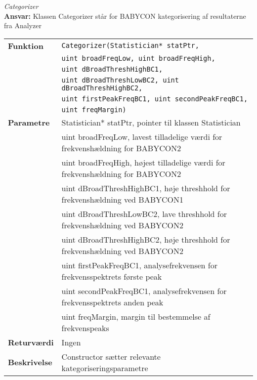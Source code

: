 \textit{Categorizer} \\
\textbf{Ansvar:} Klassen Categorizer står for BABYCON kategorisering af resultaterne fra Analyzer

\begin{center}
    \begin{tabular}{ | l | p{} |}
    \hline
    \textbf{Funktion}	& \verb+Categorizer(Statistician* statPtr,+ \\
    					& \verb+uint broadFreqLow, uint broadFreqHigh,+\\
    					& \verb+uint dBroadThreshHighBC1,+\\
    					& \verb+uint dBroadThreshLowBC2, uint dBroadThreshHighBC2,+ \\
    					& \verb+uint firstPeakFreqBC1, uint secondPeakFreqBC1,+ \\
    					& \verb+uint freqMargin) +						\\ \hline
    \textbf{Parametre} 	& Statistician* statPtr, pointer til klassen Statistician \\
    					& uint broadFreqLow, lavest tilladelige værdi for frekvenshældning for BABYCON2 \\
    					& uint broadFreqHigh, højest tilladelige værdi for frekvenshældning for BABYCON2 \\
    					& uint dBroadThreshHighBC1, høje threshhold for frekvenshældning ved BABYCON1 \\
    					& uint dBroadThreshLowBC2, lave threshhold for frekvenshældning ved BABYCON2  \\
    					& uint dBroadThreshHighBC2, høje threshhold for frekvenshældning ved BABYCON2 \\
    					& uint firstPeakFreqBC1, analysefrekvensen for frekvensspektrets første peak       \\	
    					& uint secondPeakFreqBC1, analysefrekvensen for frekvensspektrets anden peak \\
    					& uint freqMargin, margin til bestemmelse af frekvenspeaks \\ \hline
    \textbf{Returværdi}	& Ingen	 								\\ \hline
    \textbf{Beskrivelse}& Constructor sætter relevante kategoriseringsparametre		\\ \hline
    \end{tabular}
\end{center}

